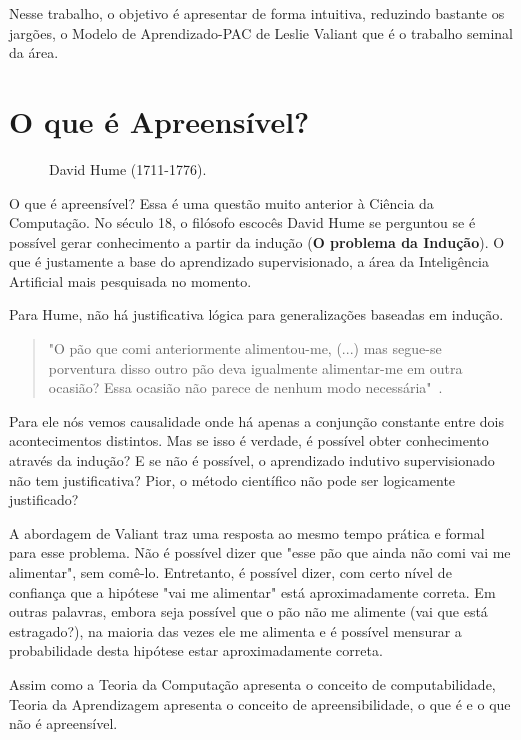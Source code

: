 \documentclass[
10pt, %
a4paper, %
onecolumn, %
]{article}
\begin{document}
Nesse trabalho, o objetivo é apresentar de forma intuitiva, reduzindo bastante os jargões, o Modelo de Aprendizado-PAC de Leslie Valiant que é o trabalho seminal da área. 


\section{O que é Apreensível?}
\begin{figure}
    \caption{David Hume (1711-1776).}
    \label{hume}
\end{figure}

O que é apreensível? Essa é uma questão muito anterior à Ciência da Computação.  No século 18, o filósofo escocês David Hume se perguntou se é possível gerar conhecimento a partir da indução (\textbf{O problema da Indução})\cite{Hume2009Tratado}.  O que é justamente a base do aprendizado supervisionado, a área da Inteligência Artificial mais pesquisada no momento.

Para Hume, não há justificativa lógica para generalizações baseadas em indução. 
\begin{quotation}
    "O pão que comi anteriormente alimentou-me, (...) mas segue-se porventura disso outro pão deva igualmente alimentar-me em outra ocasião?  Essa ocasião não parece de nenhum modo necessária"~\cite{hume2004investigacoes}.
\end{quotation}
 Para ele nós vemos causalidade onde há apenas a conjunção constante entre dois acontecimentos distintos. Mas se isso é verdade, é possível obter conhecimento através da indução?  E se não é possível, o aprendizado indutivo supervisionado não tem justificativa? Pior, o método científico não pode ser logicamente justificado?

A abordagem de Valiant traz uma resposta ao mesmo tempo prática e formal para esse problema.  Não é possível dizer que "esse pão que ainda não comi vai me alimentar", sem comê-lo. Entretanto, é possível dizer, com certo nível de confiança que a hipótese "vai me alimentar" está aproximadamente correta. Em outras palavras, embora seja possível que o pão não me alimente (vai que está estragado?), na maioria das vezes ele me alimenta e é possível mensurar a probabilidade desta hipótese estar aproximadamente correta. 

Assim como a Teoria da Computação apresenta o conceito de computabilidade, Teoria da Aprendizagem apresenta o conceito de apreensibilidade, o que é e o que não é apreensível. 
\end{document}
